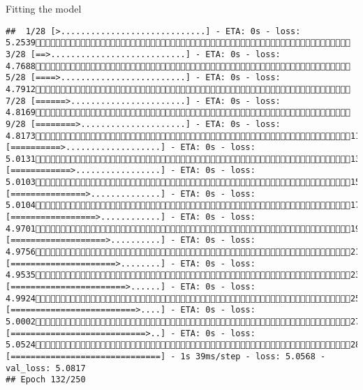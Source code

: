 \documentclass[
  ignorenonframetext,
]{beamer}
\begin{document}
\begin{frame}[fragile]{Fitting the model}
\begin{verbatim}
##  1/28 [>.............................] - ETA: 0s - loss: 5.2539 3/28 [==>...........................] - ETA: 0s - loss: 4.7688 5/28 [====>.........................] - ETA: 0s - loss: 4.7912 7/28 [======>.......................] - ETA: 0s - loss: 4.8169 9/28 [========>.....................] - ETA: 0s - loss: 4.817311/28 [==========>...................] - ETA: 0s - loss: 5.013113/28 [============>.................] - ETA: 0s - loss: 5.010315/28 [===============>..............] - ETA: 0s - loss: 5.010417/28 [=================>............] - ETA: 0s - loss: 4.970119/28 [===================>..........] - ETA: 0s - loss: 4.975621/28 [=====================>........] - ETA: 0s - loss: 4.953523/28 [=======================>......] - ETA: 0s - loss: 4.992425/28 [=========================>....] - ETA: 0s - loss: 5.000227/28 [===========================>..] - ETA: 0s - loss: 5.052428/28 [==============================] - 1s 39ms/step - loss: 5.0568 - val_loss: 5.0817
## Epoch 132/250

\end{verbatim}
\end{frame}
\end{document}

